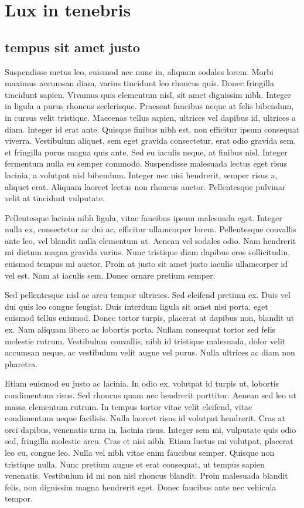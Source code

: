 \chapter{Lux in tenebris}

\section{tempus sit amet justo}
Suspendisse metus leo, euismod nec nunc in, aliquam sodales lorem. Morbi maximus accumsan diam, varius tincidunt leo rhoncus quis. Donec fringilla tincidunt sapien. Vivamus quis elementum nisl, sit amet dignissim nibh. Integer in ligula a purus rhoncus scelerisque. Praesent faucibus neque at felis bibendum, in cursus velit tristique. Maecenas tellus sapien, ultrices vel dapibus id, ultrices a diam. Integer id erat ante. Quisque finibus nibh est, non efficitur ipsum consequat viverra. Vestibulum aliquet, sem eget gravida consectetur, erat odio gravida sem, et fringilla purus magna quis ante. Sed eu iaculis neque, at finibus nisl. Integer fermentum nulla eu semper commodo. Suspendisse malesuada lectus eget risus lacinia, a volutpat nisl bibendum. Integer nec nisi hendrerit, semper risus a, aliquet erat. Aliquam laoreet lectus non rhoncus auctor. Pellentesque pulvinar velit at tincidunt vulputate.

Pellentesque lacinia nibh ligula, vitae faucibus ipsum malesuada eget. Integer nulla ex, consectetur ac dui ac, efficitur ullamcorper lorem. Pellentesque convallis ante leo, vel blandit nulla elementum at. Aenean vel sodales odio. Nam hendrerit mi dictum magna gravida varius. Nunc tristique diam dapibus eros sollicitudin, euismod tempus mi auctor. Proin at justo sit amet justo iaculis ullamcorper id vel est. Nam at iaculis sem. Donec ornare pretium semper.

Sed pellentesque nisl ac arcu tempor ultricies. Sed eleifend pretium ex. Duis vel dui quis leo congue feugiat. Duis interdum ligula sit amet nisi porta, eget euismod tellus euismod. Donec tortor turpis, placerat at dapibus non, blandit ut ex. Nam aliquam libero ac lobortis porta. Nullam consequat tortor sed felis molestie rutrum. Vestibulum convallis, nibh id tristique malesuada, dolor velit accumsan neque, ac vestibulum velit augue vel purus. Nulla ultrices ac diam non pharetra.

Etiam euismod eu justo ac lacinia. In odio ex, volutpat id turpis ut, lobortis condimentum risus. Sed rhoncus quam nec hendrerit porttitor. Aenean sed leo ut massa elementum rutrum. In tempus tortor vitae velit eleifend, vitae condimentum neque facilisis. Nulla laoreet risus id volutpat hendrerit. Cras at orci dapibus, venenatis urna in, lacinia risus. Integer sem mi, vulputate quis odio sed, fringilla molestie arcu. Cras et nisi nibh. Etiam luctus mi volutpat, placerat leo eu, congue leo. Nulla vel nibh vitae enim faucibus semper. Quisque non tristique nulla. Nunc pretium augue et erat consequat, ut tempus sapien venenatis. Vestibulum id mi non nisl rhoncus blandit. Proin malesuada blandit felis, non dignissim magna hendrerit eget. Donec faucibus ante nec vehicula tempor.

